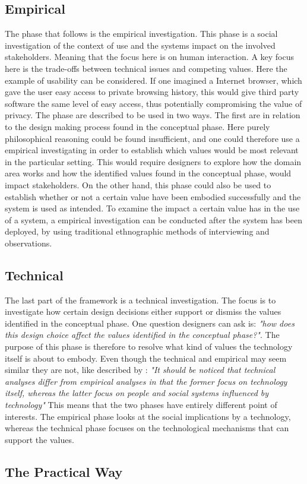 \subsection{Empirical}
The phase that follows is the empirical investigation. This phase is a social investigation of the context of use and the systems impact on the involved stakeholders. Meaning that the focus here is on human interaction. A key focus here is the trade-offs between technical issues and competing values. Here the example of usability can be considered. If one imagined a Internet browser, which gave the user easy access to private browsing history, this would give third party software the same level of easy access, thus potentially compromising the value of privacy.\newline
The phase are described to be used in two ways. The first are in relation to the design making process found in the conceptual phase. Here purely philosophical reasoning could be found insufficient, and one could therefore use a empirical investigating in order to establish which values would be most relevant in the particular setting. This would require designers to explore how the domain area works and how the identified values found in the conceptual phase, would impact stakeholders. \newline
On the other hand, this phase could also be used to establish whether or not a certain value have been embodied successfully and the system is used as intended. To examine the impact a certain value has in the use of a system, a empirical investigation can be conducted after the system has been deployed, by using traditional ethnographic methods of interviewing and observations.

\subsection{Technical}
The last  part of the framework is a technical investigation. The focus is to investigate how certain design decisions either support or dismiss the values identified in the conceptual phase. One question designers can ask is: \textit{"how does this design choice affect the values identified in the conceptual phase?"}. The purpose of this phase is therefore to resolve what kind of values the technology itself is about to embody. Even though the technical and empirical may seem similar they are not, like described by \citet[p. 67]{EthicsAndTechnologyDesign}: \textit{"It should be noticed that technical analyses differ from empirical analyses in that the former focus on technology itself, whereas the latter focus on people and social systems influenced by technology"}\newline
This means that the two phases have entirely different point of interests. The empirical phase looks at the social implications by a technology, whereas the technical phase focuses on the technological mechanisms that can support the values. 

\subsection{The Practical Way}

